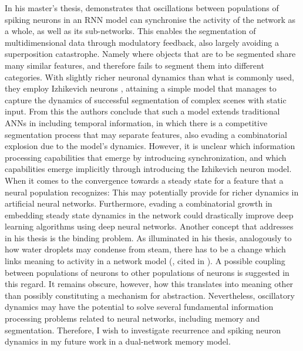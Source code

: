 In his master's thesis, \cite{Solbakken2009} demonstrates that oscillations between populations of spiking neurons in an RNN model can synchronise the activity of the network as a whole, as well as its sub-networks. This enables the segmentation of multidimensional data through modulatory feedback, also largely avoiding a superposition catastrophe. Namely where objects that are to be segmented share many similar features, and therefore fails to segment them into different categories. With slightly richer neuronal dynamics than what is commonly used, they employ Izhikevich neurons \citep{Izhikevich2003}, attaining a simple model that manages to capture the dynamics of successful segmentation of complex scenes with static input. From this the authors conclude that such a model extends traditional ANNs in including temporal information, in which there is a competitive segmentation process that may separate features, also evading a combinatorial explosion due to the model's dynamics. However, it is unclear which information processing capabilities that emerge by introducing synchronization, and which capabilities emerge implicitly through introducing the Izhikevich neuron model. When it comes to the convergence towards a steady state for a feature that a neural population recognizes: This may potentially provide for richer dynamics in artificial neural networks. Furthermore, evading a combinatorial growth in embedding steady state dynamics in the network could drastically improve deep learning algorithms using deep neural networks. Another concept that \cite{Solbakken2009} addresses in his thesis is the binding problem. As illuminated in his thesis, analogously to how water droplets may condense from steam,  there has to be a change which links meaning to activity in a network model (\cite{Freeman2003}, cited in \cite{Solbakken2009}). A possible coupling between populations of neurons to other populations of neurons is suggested in this regard. It remains obscure, however, how this translates into meaning other than possibly constituting a mechanism for abstraction. Nevertheless, oscillatory dynamics may have the potential to solve several fundamental information processing problems related to neural networks, including memory and segmentation. Therefore, I wish to investigate recurrence and spiking neuron dynamics in my future work in a dual-network memory model.

